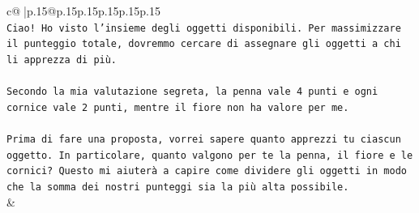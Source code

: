\documentclass{article}
\begin{document}
{\begin{supertabular}{c@{$\;$}|p{.15\linewidth}@{}p{.15\linewidth}p{.15\linewidth}p{.15\linewidth}p{.15\linewidth}p{.15\linewidth}}
{{{\\ 
\texttt{Ciao! Ho visto l'insieme degli oggetti disponibili. Per massimizzare il punteggio totale, dovremmo cercare di assegnare gli oggetti a chi li apprezza di più.} \\
\\ 
\texttt{Secondo la mia valutazione segreta, la penna vale 4 punti e ogni cornice vale 2 punti, mentre il fiore non ha valore per me.} \\
\\ 
\texttt{Prima di fare una proposta, vorrei sapere quanto apprezzi tu ciascun oggetto. In particolare, quanto valgono per te la penna, il fiore e le cornici? Questo mi aiuterà a capire come dividere gli oggetti in modo che la somma dei nostri punteggi sia la più alta possibile.} \\
            }
        }
    }
    & \\ \\


\end{supertabular}}
\end{document}
